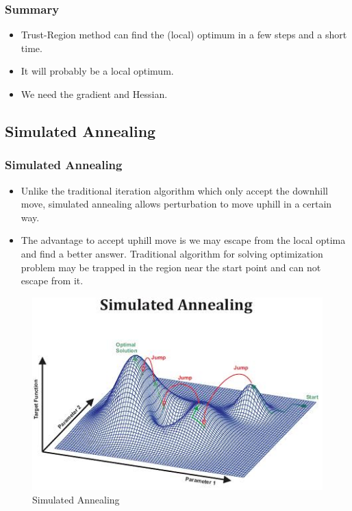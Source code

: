 \documentclass[hyperref={pdfpagelabels=false}]{beamer}
\begin{document}

\begin{frame}
\frametitle{Summary}
\begin{itemize}
\item Trust-Region method can find the (local) optimum in a few steps and a short time.
\item It will probably be a local optimum.
\item We need the gradient and Hessian.
\end{itemize}
\end{frame}

\subsection{Simulated Annealing}

\begin{frame}
\frametitle{Simulated Annealing}
\begin{itemize}
\item<1-> Unlike the traditional iteration algorithm which only accept the downhill move, simulated annealing allows perturbation to move uphill in a certain way.
\item<1-> The advantage to accept uphill move is we may escape from the local optima and find a better answer. Traditional algorithm for solving optimization problem may be trapped in the region near the start point and can not escape from it.
\end{itemize}
\end{frame}


\begin{frame}
\begin{figure}
\includegraphics[scale=0.7]{sajump.jpg}
\caption{Simulated Annealing}
\end{figure}
\end{frame}
\end{document}
